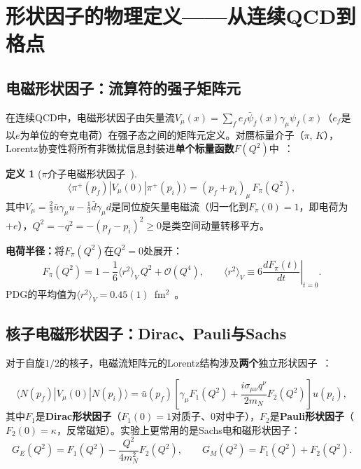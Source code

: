\documentclass[12pt,a4paper]{ctexart}
\theoremstyle{definition}
\newtheorem{definition}{定义}[section]
\begin{document}
\section{形状因子的物理定义——从连续QCD到格点}

\subsection{电磁形状因子：流算符的强子矩阵元}

在连续QCD中，电磁形状因子由矢量流$V_\mu(x) = \sum_f e_f \bar\psi_f(x) \gamma_\mu \psi_f(x)$（$e_f$是以$e$为单位的夸克电荷）在强子态之间的矩阵元定义。对赝标量介子（$\pi$, $K$），Lorentz协变性将所有非微扰信息封装进\textbf{单个标量函数}$F(Q^2)$中~\cite{GattringerLang2010}：

\begin{definition}[$\pi$介子电磁形状因子~\cite{GattringerLang2010}]
\begin{equation}
\boxed{\langle \pi^+(p_f) | V_\mu(0) | \pi^+(p_i) \rangle = (p_f + p_i)_\mu \, F_\pi(Q^2)},
\label{eq:pion_FF}
\end{equation}
其中$V_\mu = \frac{2}{3}\bar u\gamma_\mu u - \frac{1}{3}\bar d\gamma_\mu d$是同位旋矢量电磁流（归一化到$F_\pi(0) = 1$，即电荷为$+e$），$Q^2 = -q^2 = -(p_f-p_i)^2 \ge 0$是类空间动量转移平方。
\end{definition}

\textbf{电荷半径：}将$F_\pi(Q^2)$在$Q^2=0$处展开：
\begin{equation}
F_\pi(Q^2) = 1 - \frac{1}{6} \langle r^2 \rangle_V \, Q^2 + \mathcal{O}(Q^4),
\qquad \langle r^2 \rangle_V \equiv 6 \left.\frac{dF_\pi(t)}{dt}\right|_{t=0}.
\label{eq:charge_radius}
\end{equation}
PDG的平均值为$\langle r^2 \rangle_V = 0.45(1)$~fm$^2$~\cite{GattringerLang2010}。

\subsection{核子电磁形状因子：Dirac、Pauli与Sachs}

对于自旋$1/2$的核子，电磁流矩阵元的Lorentz结构涉及\textbf{两个}独立形状因子~\cite{GattringerLang2010}：

\begin{equation}
\langle N(p_f) | V_\mu(0) | N(p_i) \rangle = \bar u(p_f) \left[ \gamma_\mu F_1(Q^2) + \frac{i\sigma_{\mu\nu} q^\nu}{2m_N} F_2(Q^2) \right] u(p_i),
\label{eq:nucleon_FF}
\end{equation}
其中$F_1$是\textbf{Dirac形状因子}（$F_1(0) = 1$对质子、$0$对中子），$F_2$是\textbf{Pauli形状因子}（$F_2(0) = \kappa$，反常磁矩）。实验上更常用的是Sachs电和磁形状因子：
\begin{equation}
G_E(Q^2) = F_1(Q^2) - \frac{Q^2}{4m_N^2} F_2(Q^2), \qquad
G_M(Q^2) = F_1(Q^2) + F_2(Q^2).
\label{eq:Sachs_FF}
\end{equation}
\end{document}
